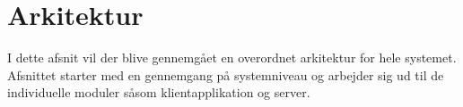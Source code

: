 \chapter{Arkitektur}
I dette afsnit vil der blive gennemgået en overordnet arkitektur for hele systemet. Afsnittet starter med en gennemgang på  systemniveau og arbejder sig ud til de individuelle moduler såsom klientapplikation og server.  